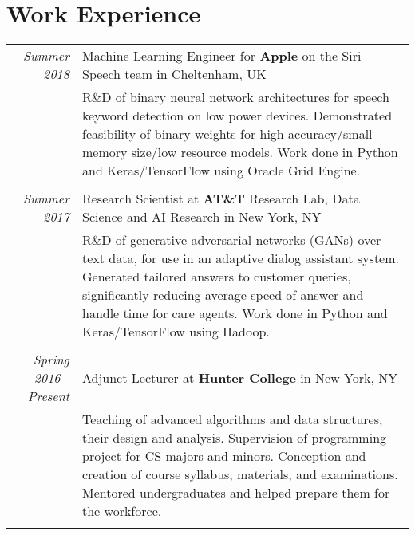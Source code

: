 \documentclass[a4paper,10pt]{article}
\begin{document}
\section{Work Experience}
    \vspace{0.2cm}
    \begin{tabular}{r|p{14cm}}
        \emph{Summer 2018} & Machine Learning Engineer for {\bfseries Apple} on the Siri Speech team in Cheltenham, UK\\
        & \small{R\&D of binary neural network architectures for speech keyword detection on low power devices. Demonstrated feasibility of binary weights for high accuracy/small memory size/low resource models. Work done in Python and Keras/TensorFlow using Oracle Grid Engine.}\\
        \multicolumn{2}{c}{} \\

        \emph{Summer 2017}& Research Scientist at {\bfseries AT\&T} Research Lab, Data Science and AI Research in New York, NY\\
        & \small{R\&D of generative adversarial networks (GANs) over text data, for use in an adaptive dialog assistant system. Generated tailored answers to customer queries, significantly reducing average speed of answer and handle time for care agents. Work done in Python and Keras/TensorFlow using Hadoop.}\\
        \multicolumn{2}{c}{} \\
        
        \emph{Spring 2016 - Present} &  Adjunct Lecturer at {\bfseries Hunter College} in New York, NY\\
        & \small{Teaching of advanced algorithms and data structures, their design and analysis. Supervision of programming project for CS majors and minors. Conception and creation of course syllabus, materials, and examinations. Mentored undergraduates and helped prepare them for the workforce. }\\
        \multicolumn{2}{c}{} \\
        

\end{tabular}
\end{document}
